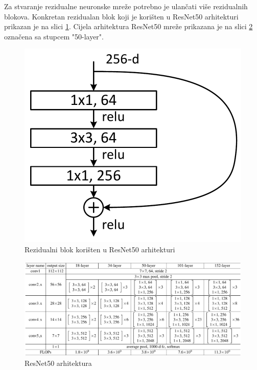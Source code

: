 \documentclass[times, utf8, zavrsni,numeric,pstricks]{fer}
\begin{document}
Za stvaranje rezidualne neuronske mreže potrebno je ulančati više rezidualnih blokova. Konkretan rezidualan blok koji je korišten u ResNet50 arhitekturi prikazan je na slici \ref{fig:residual_block_50}. Cijela arhitektura ResNet50 mreže prikazana je na slici \ref{fig:resnet_arh} označena sa stupcem "50-layer". 

\begin{figure}[H]
	\centering
	\includegraphics[width=\linewidth, height=0.3\paperheight,keepaspectratio]{resnet_50_block.jpeg}
	\caption{Rezidualni blok korišten u ResNet50 arhitekturi \cite{residual}}
	\label{fig:residual_block_50}
\end{figure}

\begin{figure}[H]
	\centering
	\includegraphics[width=\linewidth, height=0.3\paperheight,keepaspectratio]{resnet_arh.jpeg}
	\caption{ResNet50 arhitektura \cite{residual}}
	\label{fig:resnet_arh}
\end{figure}
\end{document}
